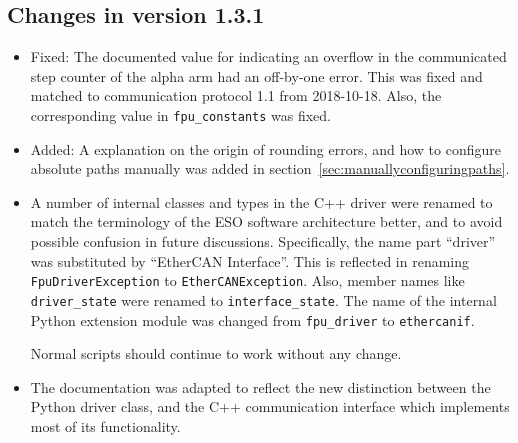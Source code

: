 \documentclass[11pt,a4paper]{report}
\begin{document}
\subsection*{Changes in version 1.3.1}
\begin{itemize}
\item Fixed: The documented value for indicating an overflow in the
  communicated step counter of the alpha arm had an off-by-one error.
  This was fixed and matched to communication protocol 1.1 from
  2018-10-18. Also, the corresponding value in \texttt{fpu\_constants}
  was fixed.
\item Added: A explanation on the origin of rounding errors, and how
  to configure absolute paths manually was added in
  section~\ref{sec:manuallyconfiguringpaths}.
  
\item A number of internal classes and types in the C++ driver were
  renamed to match the terminology of the ESO software architecture
  better, and to avoid possible confusion in future
  discussions. Specifically, the name part ``driver'' was substituted
  by ``EtherCAN Interface''.  This is reflected in renaming
  \texttt{FpuDriverException} to \texttt{EtherCANException}. Also,
  member names like \texttt{driver\_state} were renamed to
  \texttt{interface\_state}. The name of the internal Python extension
  module was changed from \texttt{fpu\_driver} to \texttt{ethercanif}.

  Normal scripts should continue to work without any change.
  

\item The documentation was adapted to reflect the new distinction
  between the Python driver class, and the C++ communication interface
  which implements most of its functionality.
\end{itemize}
\end{document}
